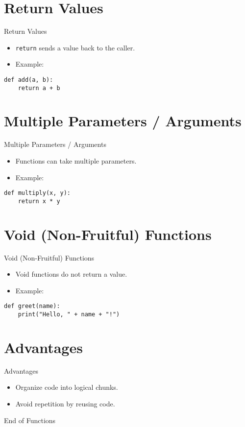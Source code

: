 \documentclass[serif, aspectratio=169]{beamer}
\begin{document}
\section{Return Values}

\begin{frame}[fragile]{Return Values}
    \begin{itemize}
        \item \texttt{return} sends a value back to the caller.
        \item Example:
    \end{itemize}
    \begin{lstlisting}
def add(a, b):
    return a + b
    \end{lstlisting}
\end{frame}

\section{Multiple Parameters / Arguments}

\begin{frame}[fragile]{Multiple Parameters / Arguments}
    \begin{itemize}
        \item Functions can take multiple parameters.
        \item Example:
    \end{itemize}
    \begin{lstlisting}
def multiply(x, y):
    return x * y
    \end{lstlisting}
\end{frame}

\section{Void (Non-Fruitful) Functions}

\begin{frame}[fragile]{Void (Non-Fruitful) Functions}
    \begin{itemize}
        \item Void functions do not return a value.
        \item Example:
    \end{itemize}
    \begin{lstlisting}
def greet(name):
    print("Hello, " + name + "!")
    \end{lstlisting}
\end{frame}

\section{Advantages}
\begin{frame}{Advantages}
    \begin{itemize}
        \item Organize code into logical chunks.
        \item Avoid repetition by reusing code.
    \end{itemize}
\end{frame}

\begin{frame}
    \begin{center}
        {\Huge End of Functions}
    \end{center}
\end{frame}
\end{document}
